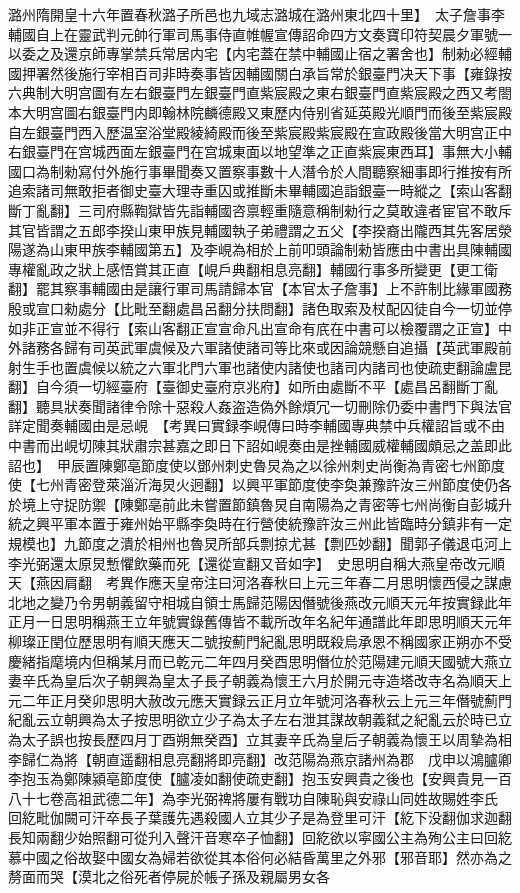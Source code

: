 潞州隋開皇十六年置春秋潞子所邑也九域志潞城在潞州東北四十里】　太子詹事李輔國自上在靈武判元帥行軍司馬事侍直帷幄宣傳詔命四方文奏寶印符契晨夕軍號一以委之及還京師專掌禁兵常居内宅【内宅蓋在禁中輔國止宿之署舍也】制勑必經輔國押署然後施行宰相百司非時奏事皆因輔國關白承旨常於銀臺門决天下事【雍錄按六典制大明宫圖有左右銀臺門左銀臺門直紫宸殿之東右銀臺門直紫宸殿之西又考閤本大明宫圖右銀臺門内即翰林院麟德殿又東歷内侍别省延英殿光順門而後至紫宸殿自左銀臺門西入歷温室浴堂殿綾綺殿而後至紫宸殿紫宸殿在宣政殿後當大明宫正中右銀臺門在宫城西面左銀臺門在宫城東面以地望準之正直紫宸東西耳】事無大小輔國口為制勑寫付外施行事畢聞奏又置察事數十人潛令於人間聽察細事即行推按有所追索諸司無敢拒者御史臺大理寺重囚或推斷未畢輔國追詣銀臺一時縱之【索山客翻斷丁亂翻】三司府縣鞫獄皆先詣輔國咨禀輕重隨意稱制勑行之莫敢違者宦官不敢斥其官皆謂之五郎李揆山東甲族見輔國執子弟禮謂之五父【李揆裔出隴西其先客居滎陽遂為山東甲族李輔國第五】及李峴為相於上前叩頭論制勑皆應由中書出具陳輔國專權亂政之狀上感悟賞其正直【峴戶典翻相息亮翻】輔國行事多所變更【更工衛翻】罷其察事輔國由是讓行軍司馬請歸本官【本官太子詹事】上不許制比緣軍國務殷或宣口勑處分【比毗至翻處昌呂翻分扶問翻】諸色取索及杖配囚徒自今一切並停如非正宣並不得行【索山客翻正宣宣命凡出宣命有㡳在中書可以檢覆謂之正宣】中外諸務各歸有司英武軍虞候及六軍諸使諸司等比來或因論競懸自追攝【英武軍殿前射生手也置虞候以統之六軍北門六軍也諸使内諸使也諸司内諸司也使疏吏翻論盧昆翻】自今須一切經臺府【臺御史臺府京兆府】如所由處斷不平【處昌呂翻斷丁亂翻】聽具狀奏聞諸律令除十惡殺人姦盗造偽外餘煩冗一切刪除仍委中書門下與法官詳定聞奏輔國由是忌峴　【考異曰實録李峴傳曰時李輔國專典禁中兵權詔旨或不由中書而出峴切陳其狀肅宗甚嘉之即日下詔如峴奏由是挫輔國威權輔國頗忌之盖即此詔也】　甲辰置陳鄭亳節度使以鄧州刺史魯炅為之以徐州刺史尚衡為青密七州節度使【七州青密登萊淄沂海炅火迥翻】以興平軍節度使李奐兼豫許汝三州節度使仍各於境上守捉防禦【陳鄭亳前此未嘗置節鎮魯炅自南陽為之青密等七州尚衡自彭城升統之興平軍本置于雍州始平縣李奐時在行營使統豫許汝三州此皆臨時分鎮非有一定規模也】九節度之潰於相州也魯炅所部兵剽掠尤甚【剽匹妙翻】聞郭子儀退屯河上李光弼還太原炅慙懼飲藥而死【還從宣翻又音如字】　史思明自稱大燕皇帝改元順天【燕因肩翻　考異作應天皇帝注曰河洛春秋曰上元三年春二月思明懷西侵之謀慮北地之變乃令男朝義留守相城自領士馬歸范陽因僭號後燕改元順天元年按實録此年正月一日思明稱燕王立年號實錄舊傳皆不載所改年名紀年通譜此年即思明順天元年柳璨正閏位歷思明有順天應天二號按薊門紀亂思明既殺烏承恩不稱國家正朔亦不受慶緒指麾境内但稱某月而已乾元二年四月癸酉思明僭位於范陽建元順天國號大燕立妻辛氏為皇后次子朝興為皇太子長子朝義為懷王六月於開元寺造塔改寺名為順天上元二年正月癸卯思明大赦改元應天實録云正月立年號河洛春秋云上元三年僭號薊門紀亂云立朝興為太子按思明欲立少子為太子左右泄其謀故朝義弑之紀亂云於時已立為太子誤也按長歷四月丁酉朔無癸酉】立其妻辛氏為皇后子朝義為懷王以周摯為相李歸仁為將【朝直遥翻相息亮翻將即亮翻】改范陽為燕京諸州為郡　戊申以鴻臚卿李抱玉為鄭陳潁亳節度使【臚凌如翻使疏吏翻】抱玉安興貴之後也【安興貴見一百八十七卷高祖武德二年】為李光弼禆將屢有戰功自陳恥與安祿山同姓故賜姓李氏　回紇毗伽闕可汗卒長子葉護先遇殺國人立其少子是為登里可汗【紇下没翻伽求迦翻長知兩翻少始照翻可從刋入聲汗音寒卒子恤翻】回紇欲以寜國公主為殉公主曰回紇慕中國之俗故娶中國女為婦若欲從其本俗何必結昏萬里之外邪【邪音耶】然亦為之剺面而哭【漠北之俗死者停屍於帳子孫及親屬男女各